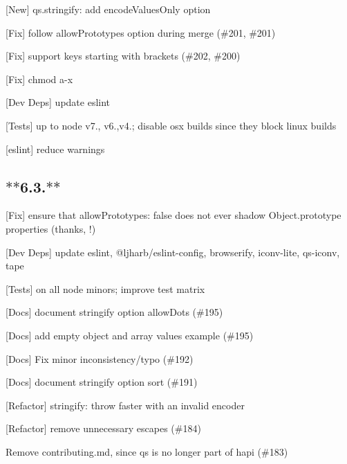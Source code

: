 
\begin{DoxyItemize}
\item \mbox{[}New\mbox{]} {\ttfamily qs.\+stringify}\+: add {\ttfamily encode\+Values\+Only} option
\item \mbox{[}Fix\mbox{]} follow {\ttfamily allow\+Prototypes} option during merge (\#201, \#201)
\item \mbox{[}Fix\mbox{]} support keys starting with brackets (\#202, \#200)
\item \mbox{[}Fix\mbox{]} chmod a-\/x
\item \mbox{[}Dev Deps\mbox{]} update {\ttfamily eslint}
\item \mbox{[}Tests\mbox{]} up to {\ttfamily node} {\ttfamily v7.}, {\ttfamily v6.},{\ttfamily v4.}; disable osx builds since they block linux builds
\item \mbox{[}eslint\mbox{]} reduce warnings
\end{DoxyItemize}

\subsection*{$\ast$$\ast$6.3.$\ast$$\ast$}


\begin{DoxyItemize}
\item \mbox{[}Fix\mbox{]} ensure that {\ttfamily allow\+Prototypes\+: false} does not ever shadow Object.\+prototype properties (thanks, !)
\item \mbox{[}Dev Deps\mbox{]} update {\ttfamily eslint}, {\ttfamily @ljharb/eslint-\/config}, {\ttfamily browserify}, {\ttfamily iconv-\/lite}, {\ttfamily qs-\/iconv}, {\ttfamily tape}
\item \mbox{[}Tests\mbox{]} on all node minors; improve test matrix
\item \mbox{[}Docs\mbox{]} document stringify option {\ttfamily allow\+Dots} (\#195)
\item \mbox{[}Docs\mbox{]} add empty object and array values example (\#195)
\item \mbox{[}Docs\mbox{]} Fix minor inconsistency/typo (\#192)
\item \mbox{[}Docs\mbox{]} document stringify option {\ttfamily sort} (\#191)
\item \mbox{[}Refactor\mbox{]} {\ttfamily stringify}\+: throw faster with an invalid encoder
\item \mbox{[}Refactor\mbox{]} remove unnecessary escapes (\#184)
\item Remove contributing.\+md, since {\ttfamily qs} is no longer part of {\ttfamily hapi} (\#183)
\end{DoxyItemize}

